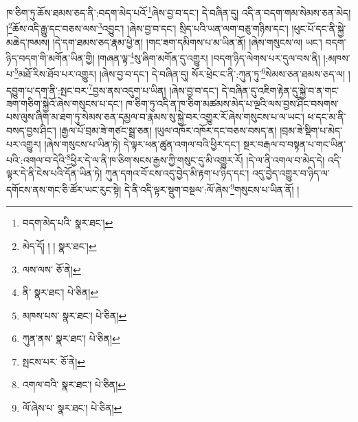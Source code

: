 ཁ་ཅིག་ཏུ་ཆོས་ཐམས་ཅད་ནི་:བདག་མེད་པའོ་\footnote{བདག་མེད་པའི་  སྣར་ཐང་། }ཞེས་བྱ་བ་དང་། དེ་བཞིན་དུ། འདི་ན་བདག་གམ་སེམས་ཅན་མེད། །\footnote{མེད་དོ། ། །  སྣར་ཐང་། }ཆོས་འདི་རྒྱུ་དང་བཅས་ལས་\footnote{ལས་ལས་  ཅོ་ནེ། }འབྱུང་། །ཞེས་བྱ་བ་དང་། སྲིད་པའི་ཡན་ལག་བཅུ་གཉིས་དང་། །ཕུང་པོ་དང་ནི་སྐྱེ་མཆེད་ཁམས། །དེ་དག་ཐམས་ཅད་རྣམ་ཕྱེ་ན། །གང་ཟག་དམིགས་པ་མ་ཡིན་ནོ། །ཞེས་གསུངས་ལ། ཡང་། བདག་ཉིད་བདག་གི་མགོན་ཡིན་གྱི། །གཞན་ལྟ་\footnote{ནི་  སྣར་ཐང་།  པེ་ཅིན། }སུ་ཞིག་མགོན་དུ་འགྱུར། །བདག་ཉིད་ལེགས་པར་དུལ་བས་ནི། །:མཁས་པ་\footnote{མཁས་པས་  སྣར་ཐང་།  པེ་ཅིན། }མཐོ་རིས་ཐོབ་པར་འགྱུར། །ཞེས་བྱ་བ་དང་། དེ་བཞིན་དུ། སོར་ཕྲེང་ང་ནི་:ཀུན་ཏུ་\footnote{ཀུན་ནས་  སྣར་ཐང་།  པེ་ཅིན། }སེམས་ཅན་ཐམས་ཅད་ལ། །དབྱུག་པ་དག་ནི་:སྤང་བར་\footnote{སྤངས་པར་  ཅོ་ནེ། }བྱས་ནས་འདུག་པ་ཡིན། །ཞེས་བྱ་བ་དང་། དེ་བཞིན་དུ་འཇིག་རྟེན་དུ་སྐྱེ་བ་ན་གང་ཟག་གཅིག་སྐྱེའོ་ཞེས་གསུངས་པ་དང་། ཁ་ཅིག་ཏུ་འདི་ན་ཁ་ཅིག་མཚམས་མེད་པ་ལྔའི་ལས་བྱས་ཤིང་བསགས་པས་ལུས་ཞིག་མ་ཐག་ཏུ་སེམས་ཅན་དམྱལ་བ་རྣམས་སུ་སྐྱེ་བར་འགྱུར་རོ་ཞེས་གསུངས་པ་ལ་ཡང་། ཕ་དང་མ་ནི་བསད་བྱས་ཤིང་། །རྒྱལ་པོ་བྲམ་ཟེ་གཙང་སྦྲ་ཅན། །ཡུལ་འཁོར་འཁོར་དང་བཅས་བསད་ན། །བྲམ་ཟེ་སྡིག་པ་མེད་པར་འགྱུར། །ཞེས་གསུངས་པ་ཡིན་ཏེ། དེ་ལྟར་ཕན་ཚུན་འགལ་བའི་ཕྱིར་དང་། སྔར་བརྒལ་བ་བསྟན་པ་གང་ཡིན་པའི་:འགལ་བ་དེའི་\footnote{འགལ་བའི་  སྣར་ཐང་།  པེ་ཅིན། }ཕྱིར་དེ་ལ་ནི་ཁ་ཅིག་སངས་རྒྱས་ཀྱི་གསུང་དུ་མི་འགྱུར་རོ། །དེ་ལ་ནི་འགལ་བ་མེད་དེ། འདི་ལྟར་དེ་ནི་ངེས་པའི་དོན་ཡིན་ཏེ། ཀུན་དགའ་བོ་ངས་འདུ་བྱེད་མི་རྟག་པ་ཉིད་དང་། འདུ་བྱེད་འགྱུར་བ་ཉིད་ལ་དགོངས་ནས་གང་ཅི་ཚོར་ཡང་རུང་སྟེ། དེ་ནི་འདི་ལྟར་སྡུག་བསྔལ་:ལོ་ཞེས་\footnote{ལོ་ཞེས་པ་  སྣར་ཐང་།  པེ་ཅིན། }གསུངས་པ་ཡིན་ནོ། །
